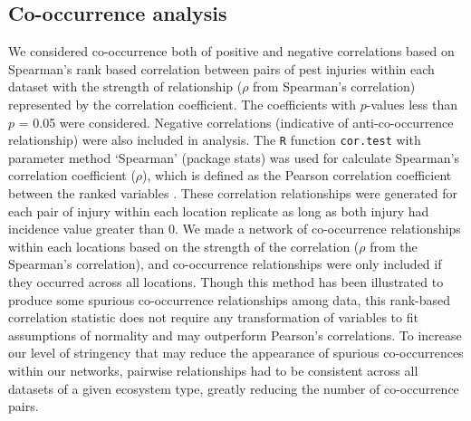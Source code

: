 \subsection*{Co-occurrence analysis}

We considered co-occurrence both of positive and negative correlations based on Spearman's rank based correlation between pairs of pest injuries within each dataset with the strength of relationship ($\rho$ from Spearman's correlation) represented by the correlation coefficient. The coefficients with $p$-values less than $p$ = 0.05 were considered. Negative correlations (indicative of anti-co-occurrence relationship) were also included in analysis. The \texttt{R} function \texttt{cor.test} with parameter method `Spearman' (package stats) was used for calculate Spearman's correlation coefficient ($\rho$), which is defined as the Pearson correlation coefficient between the ranked variables \cite{R_2015}.
These correlation relationships were generated for each pair of injury within each location replicate as long as both injury had incidence value greater than 0. We made a network of co-occurrence relationships within each locations based on the strength of the correlation ($\rho$ from the Spearman's correlation), and co-occurrence relationships were only included if they occurred across all locations. Though this method has been illustrated to produce some spurious co-occurrence relationships among data, this rank-based correlation statistic does not require any transformation of variables to fit assumptions of normality and may outperform Pearson’s correlations. To increase our level of stringency that may reduce the appearance of spurious co-occurrences within our networks, pairwise relationships had to be consistent across all datasets of a given ecosystem type, greatly reducing the number of co-occurrence pairs.
